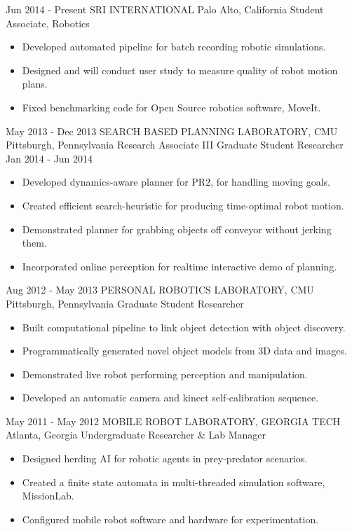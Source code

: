 \documentclass[]{friggeri-cv} %
\begin{document}
\begin{entrylist}
\jobentry
{Jun 2014 - Present}
{SRI INTERNATIONAL}
{Palo Alto, California}
{Student Associate, Robotics}
{\begin{itemize}
\item Developed automated pipeline for batch recording robotic simulations.
\item Designed and will conduct user study to measure quality of robot motion plans.
\item Fixed benchmarking code for Open Source robotics software, MoveIt.
\end{itemize}}
\jjobentry
{May 2013 - Dec 2013}
{SEARCH BASED PLANNING LABORATORY, CMU}
{Pittsburgh, Pennsylvania}
{Research Associate III}
{Graduate Student Researcher}
{Jan 2014 - Jun 2014}
{\begin{itemize}\item Developed dynamics-aware planner for PR2, for handling moving goals.
\item Created efficient search-heuristic for producing time-optimal robot motion.
\item Demonstrated planner for grabbing objects off conveyor without jerking them.
\item Incorporated online perception for realtime interactive demo of planning.
\end{itemize}}
\jobentry
{Aug 2012 - May 2013}
{PERSONAL ROBOTICS LABORATORY, CMU}
{Pittsburgh, Pennsylvania}
{Graduate Student Researcher}
{\begin{itemize}\item Built computational pipeline to link object detection with object discovery.
\item Programmatically generated novel object models from 3D data and images.
\item Demonstrated live robot performing perception and manipulation.
\item Developed an automatic camera and kinect self-calibration sequence.
\end{itemize}}
\jobentry
{May 2011 - May 2012}
{MOBILE ROBOT LABORATORY, GEORGIA TECH}
{Atlanta, Georgia}
{Undergraduate Researcher \& Lab Manager}
{\begin{itemize}\item Designed herding AI for robotic agents in prey-predator scenarios.
\item Created a finite state automata in multi-threaded simulation software, MissionLab.
\item Configured mobile robot software and hardware for experimentation.
\end{itemize}}
\end{entrylist}
\end{document}
